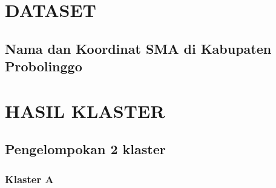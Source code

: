 \newpage
\thispagestyle{empty}
\appendix
\renewcommand{\thechapter}{\arabic{chapter}}
\renewcommand{\thesection}{\thechapter.\arabic{section}}
\renewcommand{\thesubsection}{\thechapter.\arabic{section}.\arabic{subsection}}
\chapter{DATASET}
\label{lampiran1}
\section{Nama dan Koordinat SMA di Kabupaten Probolinggo}



\chapter{HASIL KLASTER}
\label{lampiran2}

\section{Pengelompokan 2 klaster}

\subsection{Klaster A}







